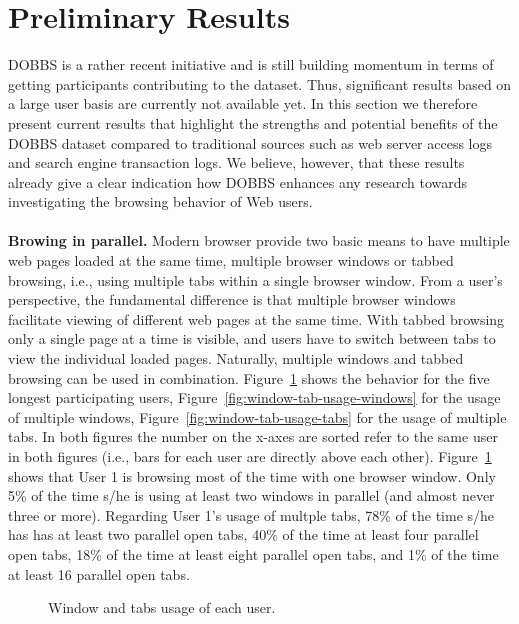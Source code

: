 \documentclass[11pt,fleqn,twoside]{article}
\begin{document}
\section{Preliminary Results}
\label{sec:evaluation}
DOBBS is a rather recent initiative and is still building momentum in terms of getting participants contributing to the dataset. Thus, significant results based on a large user basis are currently not available yet. In this section we therefore present current results that highlight the strengths and potential benefits of the DOBBS dataset compared to traditional sources such as web server access logs and search engine transaction logs. We believe, however, that these results already give a clear indication how DOBBS enhances any research towards investigating the browsing behavior of Web users.
\\
\\
\textbf{Browing in parallel.}
Modern browser provide two basic means to have multiple web pages loaded at the same time, multiple browser windows or tabbed browsing, i.e., using multiple tabs within a single browser window. From a user's perspective, the fundamental difference is that multiple browser windows facilitate viewing of different web pages at the same time. With tabbed browsing only a single page at a time is visible, and users have to switch between tabs to view the individual loaded pages. Naturally, multiple windows and tabbed browsing can be used in combination. Figure~\ref{fig:window-tab-usage} shows the behavior for the five longest participating users, Figure~\ref{fig:window-tab-usage-windows} for the usage of multiple windows, Figure~\ref{fig:window-tab-usage-tabs} for the usage of multiple tabs. In both figures the number on the x-axes are sorted refer to the same user in both figures (i.e., bars for each user are directly above each other). Figure~\ref{fig:window-tab-usage} shows that User 1 is browsing most of the 
time with one browser window. Only 5\% of the time s/he is using at least two windows in parallel (and almost never three or more). Regarding User 1's usage of multple tabs, 78\%  of the time s/he has has at least two parallel open tabs, 40\% of the time at least four parallel open tabs, 18\% of the time at least eight parallel open tabs, and 1\% of the time at least 16 parallel open tabs.
\begin{figure}[tb]
\centering
{}
\caption[]{Window and tabs usage of each user.}
\label{fig:window-tab-usage}
\end{figure}
\end{document}
